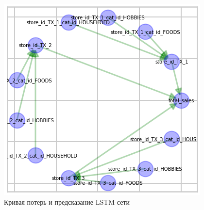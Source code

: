 \def\figurename{Рис}
\begin{figure}[t]
	\centering
	\includegraphics[width=0.9\columnwidth]{./img/fcm_lstm_map.png}
	\caption{Кривая потерь и предсказание LSTM-сети}
	\label{img:fcm_lstm_map}
\end{figure}









